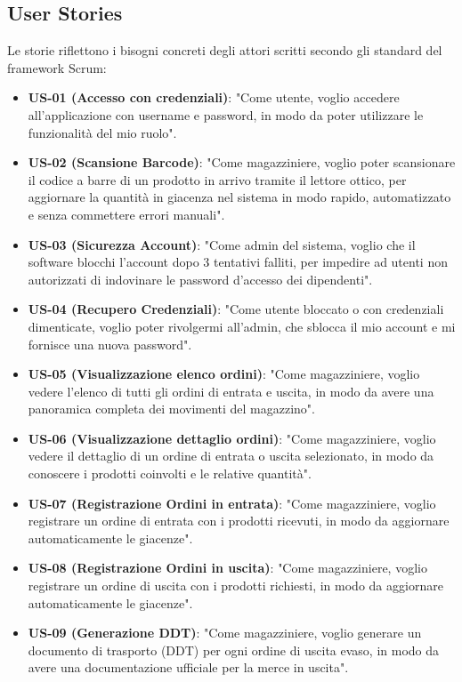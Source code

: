 \documentclass[a4paper,12pt]{article}
\begin{document}
\subsection{User Stories}
Le storie riflettono i bisogni concreti degli attori scritti secondo gli standard del framework Scrum:
\begin{itemize}
    \item \textbf{US-01 (Accesso con credenziali)}: "Come utente, voglio accedere all'applicazione con username e password, in modo da poter utilizzare le funzionalità del mio ruolo".
    \item \textbf{US-02 (Scansione Barcode)}: "Come magazziniere, voglio poter scansionare il codice a barre di un prodotto in arrivo tramite il lettore ottico, per aggiornare la quantità in giacenza nel sistema in modo rapido, automatizzato e senza commettere errori manuali".
    \item \textbf{US-03 (Sicurezza Account)}: "Come admin del sistema, voglio che il software blocchi l'account dopo 3 tentativi falliti, per impedire ad utenti non autorizzati di indovinare le password d'accesso dei dipendenti".
    \item \textbf{US-04 (Recupero Credenziali)}: "Come utente bloccato o con credenziali dimenticate, voglio poter rivolgermi all'admin, che sblocca il mio account e mi fornisce una nuova password".
    \item \textbf{US-05 (Visualizzazione elenco ordini)}: "Come magazziniere, voglio vedere l'elenco di tutti gli ordini di entrata e uscita, in modo da avere una panoramica completa dei movimenti del magazzino".
    \item \textbf{US-06 (Visualizzazione dettaglio ordini)}: "Come magazziniere, voglio vedere il dettaglio di un ordine di entrata o uscita selezionato, in modo da conoscere i prodotti coinvolti e le relative quantità".
    \item \textbf{US-07 (Registrazione Ordini in entrata)}: "Come magazziniere, voglio registrare un ordine di entrata con i prodotti ricevuti, in modo da aggiornare automaticamente le giacenze".
    \item \textbf{US-08 (Registrazione Ordini in uscita)}: "Come magazziniere, voglio registrare un ordine di uscita con i prodotti richiesti, in modo da aggiornare automaticamente le giacenze".
    \item \textbf{US-09 (Generazione DDT)}: "Come magazziniere, voglio generare un documento di trasporto (DDT) per ogni ordine di uscita evaso, in modo da avere una documentazione ufficiale per la merce in uscita".

\end{itemize}
\end{document}
